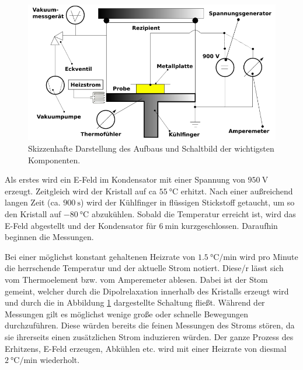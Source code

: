 \begin{figure}
    \centering
    \includegraphics[width=\textwidth]{Bilder/Zeichnung.PNG}
    \caption{Skizzenhafte Darstellung des Aufbaus und Schaltbild der wichtigsten Komponenten.}
    \label{fig:skizze}
\end{figure}


Als erstes wird ein E-Feld im Kondensator mit einer Spannung von $\SI{950}{\volt}$ erzeugt. Zeitgleich wird der Kristall auf ca $\SI{55}{\celsius}$ erhitzt. Nach einer außreichend langen Zeit (ca. $\SI{900}{\second}$) wird der Kühlfinger in flüssigen Stickstoff getaucht, um so den Kristall auf $\SI{-80}{\celsius}$ abzukühlen. Sobald die Temperatur erreicht ist, wird das E-Feld abgestellt und der Kondensator für $\SI{6}{\minute}$ kurzgeschlossen. Daraufhin beginnen die Messungen.


Bei einer möglichst konstant gehaltenen Heizrate von $\SI{1.5}{\celsius\per\minute}$ wird pro Minute die herrschende Temperatur und der aktuelle Strom notiert. Diese/r lässt sich vom Thermoelement bzw. vom Amperemeter ablesen. Dabei ist der Stom gemeint, welcher durch die Dipolrelaxation innerhalb des Kristalls erzeugt wird und durch die in Abbildung \ref{fig:skizze} dargestellte Schaltung fließt. Während der Messungen gilt es möglichst wenige große oder schnelle Bewegungen durchzuführen. Diese würden bereits die feinen Messungen des Stroms stören, da sie ihrerseits einen zusätzlichen Strom induzieren würden. 
Der ganze Prozess des Erhitzens, E-Feld erzeugen, Abkühlen etc. wird mit einer Heizrate von diesmal $\SI{2}{\celsius\per\minute}$ wiederholt.

